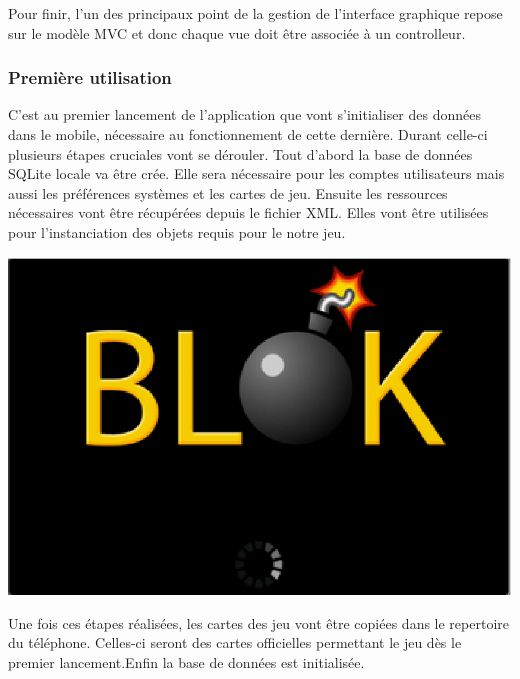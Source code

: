 	Pour finir, l'un des principaux point de la gestion de l'interface graphique repose sur le modèle MVC et donc chaque vue doit être associée à un controlleur.
				
		\subsubsection{Première utilisation}
	C'est au premier lancement de l'application que vont s'initialiser des données
	dans le mobile, nécessaire au fonctionnement de cette dernière.
	Durant celle-ci plusieurs étapes cruciales vont se dérouler. Tout d'abord la
	base de données SQLite locale va être crée. Elle sera nécessaire pour les
	comptes utilisateurs mais aussi les préférences systèmes et les cartes de jeu.
	Ensuite les ressources nécessaires vont être récupérées depuis le fichier XML.
	Elles vont être utilisées pour l'instanciation des objets requis pour le notre
	jeu. 
		\begin{center}						
			\includegraphics[scale=0.6]{Developpement/Img/1.eps}
		\end{center}
	Une fois ces étapes réalisées, les cartes des jeu vont être copiées dans
	le repertoire du téléphone. Celles-ci seront des cartes officielles permettant
	le jeu dès le premier lancement.Enfin la base de données est initialisée.
	
